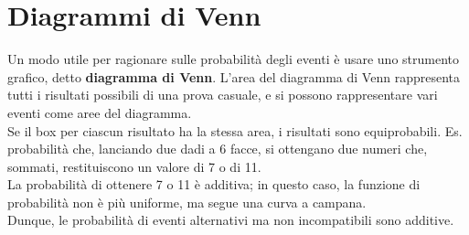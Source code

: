\documentclass[drafts, 10pt]{book}
\begin{document}
\section{Diagrammi di Venn}
Un modo utile per ragionare sulle probabilità degli eventi è usare uno strumento grafico, detto \textbf{diagramma di Venn}. L'area del diagramma di Venn rappresenta tutti i risultati possibili di una prova casuale, e si possono rappresentare vari eventi come aree del diagramma. 
\\
Se il box per ciascun risultato ha la stessa area, i risultati sono equiprobabili.
Es. probabilità che, lanciando due dadi a 6 facce, si ottengano due numeri che, sommati, restituiscono un valore di 7 o di 11.
\\
La probabilità di ottenere 7 o 11 è additiva; in questo caso, la funzione di probabilità non è più uniforme, ma segue una curva a campana.
\\
Dunque, le probabilità di eventi alternativi ma non incompatibili sono additive.
\end{document}
